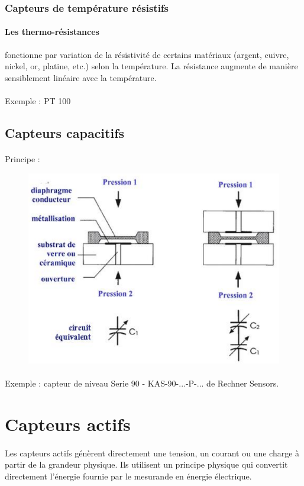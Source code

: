 \documentclass{article}
\begin{document}
\subsubsection{Capteurs de température résistifs}
\paragraph{Les thermo-résistances} fonctionne par variation de la résistivité de certains matériaux (argent, cuivre, nickel, or, platine, etc.) selon la température. La résistance augmente de manière sensiblement linéaire avec la température.

\paragraph{}
Exemple : PT 100

\subsection{Capteurs capacitifs}
\paragraph{}Principe :
\begin{figure}[H]
    \centering
    \includegraphics[width=0.6\linewidth]{./images/capteur-capacitif.png}
\end{figure}

\paragraph{}
Exemple : capteur de niveau Serie 90 - KAS-90-...-P-... de Rechner Sensors.

\newpage
\section{Capteurs actifs}
\paragraph{}
Les capteurs actifs génèrent directement une tension, un courant ou une charge à partir de la grandeur physique. Ils utilisent un principe physique qui convertit directement l'énergie fournie par le mesurande en énergie électrique.
\end{document}
